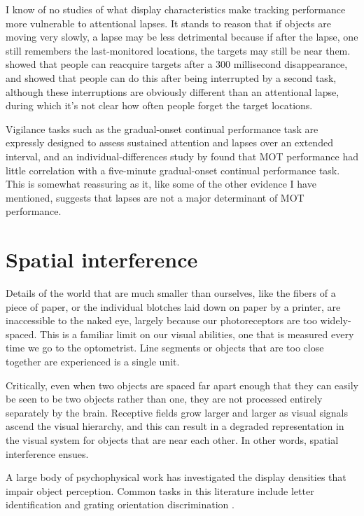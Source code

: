 \documentclass[
]{book}
\begin{document}
I know of no studies of what display characteristics make tracking performance more vulnerable to attentional lapses. It stands to reason that if objects are moving very slowly, a lapse may be less detrimental because if after the lapse, one still remembers the last-monitored locations, the targets may still be near them. \citet{fencsikRoleLocationMotion2007} showed that people can reacquire targets after a 300 millisecond disappearance, and \citet{alvarezMultielementVisualTracking2005} showed that people can do this after being interrupted by a second task, although these interruptions are obviously different than an attentional lapse, during which it's not clear how often people forget the target locations.

Vigilance tasks such as the gradual-onset continual performance task are expressly designed to assess sustained attention and lapses over an extended interval, and an individual-differences study by \citet{trevinoBridgingCognitiveNeuropsychological2021} found that MOT performance had little correlation with a five-minute gradual-onset continual performance task. This is somewhat reassuring as it, like some of the other evidence I have mentioned, suggests that lapses are not a major determinant of MOT performance.

\hypertarget{spatialInterference}{%
\chapter{Spatial interference}\label{spatialInterference}}

Details of the world that are much smaller than ourselves, like the fibers of a piece of paper, or the individual blotches laid down on paper by a printer, are inaccessible to the naked eye, largely because our photoreceptors are too widely-spaced. This is a familiar limit on our visual abilities, one that is measured every time we go to the optometrist. Line segments or objects that are too close together are experienced is a single unit.

Critically, even when two objects are spaced far apart enough that they can easily be seen to be two objects rather than one, they are not processed entirely separately by the brain. Receptive fields grow larger and larger as visual signals ascend the visual hierarchy, and this can result in a degraded representation in the visual system for objects that are near each other. In other words, spatial interference ensues.

A large body of psychophysical work has investigated the display densities that impair object perception. Common tasks in this literature include letter identification and grating orientation discrimination \citep[e.g.,][]{wolfordPerturbationModelLetter1975, korteUberGestaltauffassungIm1923, strasburgerDancingLettersTicks2014}.
\end{document}
